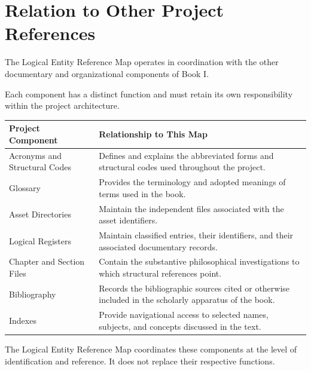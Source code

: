 \section*{Relation to Other Project References}

The Logical Entity Reference Map operates in coordination
with the other documentary and organizational components
of Book I.

Each component has a distinct function and must retain
its own responsibility within the project architecture.

\begin{center}
\small
\setlength{\tabcolsep}{4pt}
\begin{tabularx}{\textwidth}{
    >{\raggedright\arraybackslash}p{}
    >{\raggedright\arraybackslash}X
}
\toprule
\textbf{Project Component} &
\textbf{Relationship to This Map}
\\
\midrule

Acronyms and Structural Codes
&
Defines and explains the abbreviated forms and
structural codes used throughout the project.
\\

Glossary
&
Provides the terminology and adopted meanings
of terms used in the book.
\\

Asset Directories
&
Maintain the independent files associated with
the asset identifiers.
\\

Logical Registers
&
Maintain classified entries, their identifiers,
and their associated documentary records.
\\

Chapter and Section Files
&
Contain the substantive philosophical investigations
to which structural references point.
\\

Bibliography
&
Records the bibliographic sources cited or otherwise
included in the scholarly apparatus of the book.
\\

Indexes
&
Provide navigational access to selected names,
subjects, and concepts discussed in the text.
\\
\bottomrule
\end{tabularx}
\end{center}

The Logical Entity Reference Map coordinates these
components at the level of identification and reference.
It does not replace their respective functions.

